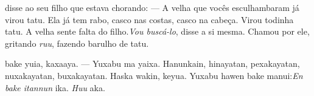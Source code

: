 
 disse ao seu
filho que estava chorando:\break
--- A velha que vocês esculhambaram
já virou tatu. Ela já tem rabo, casco
nas costas, casco na cabeça. Virou
todinha tatu. A velha sente falta
do filho.\break \textit{Vou buscá-lo}, disse a
si mesma. Chamou por ele, gritando
\textit{ruu}, fazendo barulho de tatu.

\vspace{2em}

 bake yuia, kaxaaya.\break
--- Yuxabu ma yaixa. Hanunkain, hinayatan,
pexakayatan, nuxakayatan, buxakayatan.
Haska wakin, keyua. Yuxabu hawen bake
manui:\break \emph{En bake itannun} ika. \emph{Huu} aka.

\vspace*{\fill}

